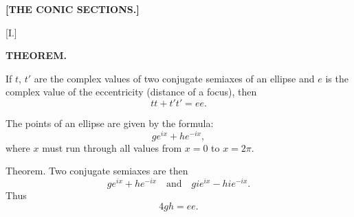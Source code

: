 \clearpage{}

\begin{center}
\textbf{[THE CONIC SECTIONS.]}
\end{center}

\begin{center}
[I.]

\textbf{THEOREM.}
\end{center}

If $t$, $t'$ are the complex values of two conjugate semiaxes of an
ellipse and $e$ is the complex value of the eccentricity (distance of a
focus), then
\[
tt + t't' = ee.
\]

The points of an ellipse are given by the formula:
\[
g e^{ix} + h e^{-ix},
\]
where $x$ must run through all values from $x = 0$ to $x = 2\pi$.

Theorem. Two conjugate semiaxes are then
\[
g e^{ix} + h e^{-ix} \quad \text{and} \quad g i e^{ix} - h i e^{-ix}.
\]
Thus
\[
4gh = ee.
\]
